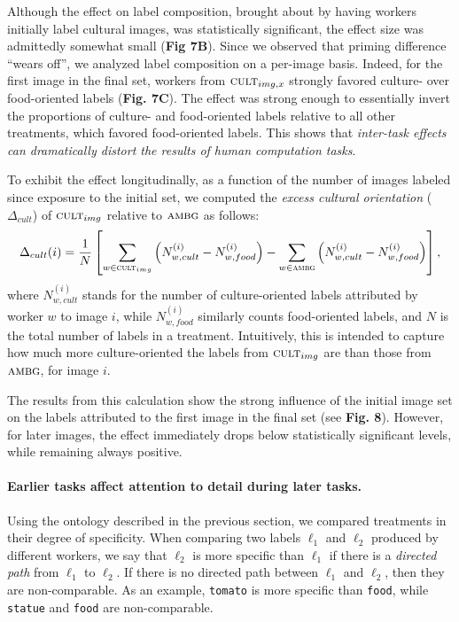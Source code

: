 \documentclass[a4paper]{report}
\begin{document}
Although the effect on label composition, brought about by having workers 
initially label cultural images, was statistically significant, the effect 
size was admittedly somewhat small (\textbf{Fig 7B}). Since we observed that 
priming 
difference ``wears off'', we analyzed label composition on a per-image basis.
Indeed, for the first image in the final set, workers from 
$\textsc{cult}_{img,x}$ strongly favored culture- over 
food-oriented labels (\textbf{Fig. 7C}). The effect was strong enough to 
essentially invert the proportions of culture- and food-oriented labels 
relative to all other treatments, which favored food-oriented labels.  
This shows that \textit{inter-task effects can dramatically distort the results
of human computation tasks}.

To exhibit the effect longitudinally, as a function of the number of images
labeled since exposure to the initial set, we computed the 
\textit{excess cultural orientation} 
($\Delta_{cult}$) of
$\textsc{cult}_{img}$ relative to $\textsc{ambg}$ as follows: 
\begin{align}
	\Delta_{cult}(i) = \frac{1}{N}\left[ \sum_{w\in\textsc{cult}_{img}} \left(N_{w,cult}^{(i)} - N_{w,food}^{(i)}\right)
	- \sum_{w\in\textsc{ambg}} \left(N_{w,cult}^{(i)} - N_{w,food}^{(i)}\right)\right],
\end{align}
where $N_{w,cult}^{(i)}$ stands for the number of culture-oriented labels 
attributed by worker $w$ to image $i$, while $N_{w,food}^{(i)}$ similarly 
counts food-oriented labels, and $N$ is the total number of labels in a 
treatment.  
Intuitively, this is intended to capture how much 
more culture-oriented the labels from $\textsc{cult}_{img}$ are than those
from $\textsc{ambg}$, for image $i$.

The results from this calculation show the strong influence of the 
initial image set on the labels attributed to the first image in the final set
(see \textbf{Fig. 8}).  However, for later images, the effect immediately 
drops below statistically significant levels, while remaining always positive.

\paragraph{Earlier tasks affect attention to detail during later tasks.} 

Using the ontology described
in the previous section, we compared treatments in their degree of specificity.
When comparing two labels $\ell_1$ and $\ell_2$ produced by different workers,
we say that $\ell_2$ is more specific than $\ell_1$ if there is a 
\textit{directed path} from $\ell_1$ to $\ell_2$.  If there is no directed path
between $\ell_1$ and $\ell_2$, then they are non-comparable.  As an example,
\texttt{tomato} is more specific than \texttt{food}, while \texttt{statue}
and \texttt{food} are non-comparable.
\end{document}
